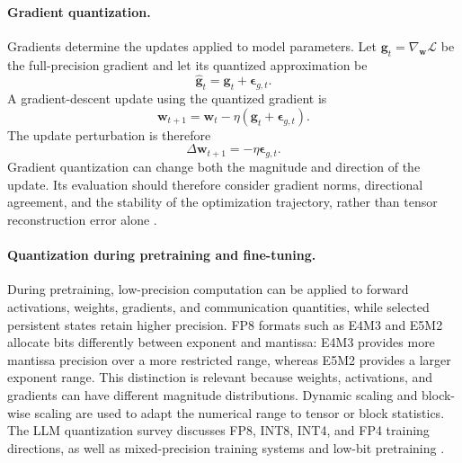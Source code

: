 \paragraph{Gradient quantization.}
Gradients determine the updates applied to model parameters. Let
\(\mathbf{g}_t=\nabla_{\mathbf{w}}\mathcal{L}\) be the full-precision
gradient and let its quantized approximation be
\begin{equation}
    \widehat{\mathbf{g}}_t
    =
    \mathbf{g}_t+\boldsymbol{\epsilon}_{g,t}.
    \label{eq:quant-gradient-error}
\end{equation}
A gradient-descent update using the quantized gradient is
\begin{equation}
    \mathbf{w}_{t+1}
    =
    \mathbf{w}_t
    -
    \eta\left(
        \mathbf{g}_t+\boldsymbol{\epsilon}_{g,t}
    \right).
    \label{eq:quant-gradient-update}
\end{equation}
The update perturbation is therefore
\begin{equation}
    \Delta\mathbf{w}_{t+1}
    =
    -\eta\boldsymbol{\epsilon}_{g,t}.
    \label{eq:quant-gradient-update-error}
\end{equation}
Gradient quantization can change both the magnitude and direction of
the update. Its evaluation should therefore consider gradient norms,
directional agreement, and the stability of the optimization
trajectory, rather than tensor reconstruction error alone
\parencite{song2026targetcentricqat}.

\paragraph{Quantization during pretraining and fine-tuning.}
During pretraining, low-precision computation can be applied to
forward activations, weights, gradients, and communication quantities,
while selected persistent states retain higher precision. FP8 formats
such as E4M3 and E5M2 allocate bits differently between exponent and
mantissa: E4M3 provides more mantissa precision over a more restricted
range, whereas E5M2 provides a larger exponent range. This distinction
is relevant because weights, activations, and gradients can have
different magnitude distributions. Dynamic scaling and block-wise
scaling are used to adapt the numerical range to tensor or block
statistics. The LLM quantization survey discusses FP8, INT8, INT4,
and FP4 training directions, as well as mixed-precision training
systems and low-bit pretraining
\parencite{chen2026llmquantization}.

